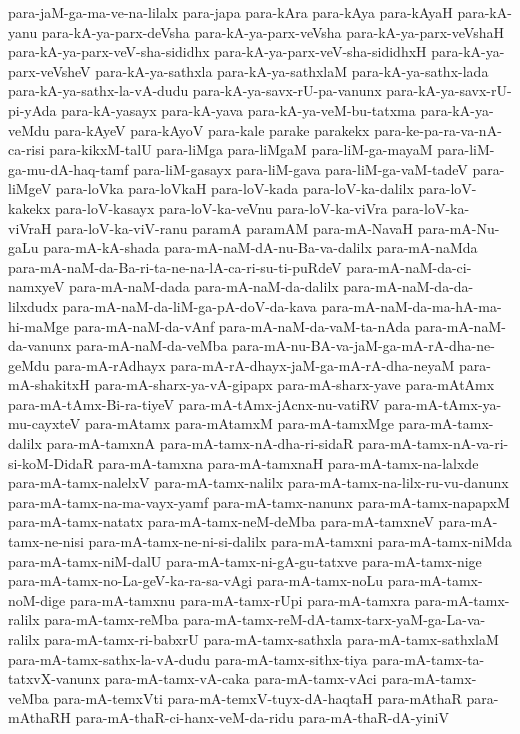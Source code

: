 {para-jaM-ga-ma-ve-na-lilalx
para-japa
para-kAra
para-kAya
para-kAyaH
para-kA-yanu
para-kA-ya-parx-deVsha
para-kA-ya-parx-veVsha
para-kA-ya-parx-veVshaH
para-kA-ya-parx-veV-sha-sididhx
para-kA-ya-parx-veV-sha-sididhxH
para-kA-ya-parx-veVsheV
para-kA-ya-sathxla
para-kA-ya-sathxlaM
para-kA-ya-sathx-lada
para-kA-ya-sathx-la-vA-dudu
para-kA-ya-savx-rU-pa-vanunx
para-kA-ya-savx-rU-pi-yAda
para-kA-yasayx
para-kA-yava
para-kA-ya-veM-bu-tatxma
para-kA-ya-veMdu
para-kAyeV
para-kAyoV
para-kale
parake
parakekx
para-ke-pa-ra-va-nA-ca-risi
para-kikxM-talU
para-liMga
para-liMgaM
para-liM-ga-mayaM
para-liM-ga-mu-dA-haq-tamf
para-liM-gasayx
para-liM-gava
para-liM-ga-vaM-tadeV
para-liMgeV
para-loVka
para-loVkaH
para-loV-kada
para-loV-ka-dalilx
para-loV-kakekx
para-loV-kasayx
para-loV-ka-veVnu
para-loV-ka-viVra
para-loV-ka-viVraH
para-loV-ka-viV-ranu
paramA
paramAM
para-mA-NavaH
para-mA-Nu-gaLu
para-mA-kA-shada
para-mA-naM-dA-nu-Ba-va-dalilx
para-mA-naMda
para-mA-naM-da-Ba-ri-ta-ne-na-lA-ca-ri-su-ti-puRdeV
para-mA-naM-da-ci-namxyeV
para-mA-naM-dada
para-mA-naM-da-dalilx
para-mA-naM-da-da-lilxdudx
para-mA-naM-da-liM-ga-pA-doV-da-kava
para-mA-naM-da-ma-hA-ma-hi-maMge
para-mA-naM-da-vAnf
para-mA-naM-da-vaM-ta-nAda
para-mA-naM-da-vanunx
para-mA-naM-da-veMba
para-mA-nu-BA-va-jaM-ga-mA-rA-dha-ne-geMdu
para-mA-rAdhayx
para-mA-rA-dhayx-jaM-ga-mA-rA-dha-neyaM
para-mA-shakitxH
para-mA-sharx-ya-vA-gipapx
para-mA-sharx-yave
para-mAtAmx
para-mA-tAmx-Bi-ra-tiyeV
para-mA-tAmx-jAcnx-nu-vatiRV
para-mA-tAmx-ya-mu-cayxteV
para-mAtamx
para-mAtamxM
para-mA-tamxMge
para-mA-tamx-dalilx
para-mA-tamxnA
para-mA-tamx-nA-dha-ri-sidaR
para-mA-tamx-nA-va-ri-si-koM-DidaR
para-mA-tamxna
para-mA-tamxnaH
para-mA-tamx-na-lalxde
para-mA-tamx-nalelxV
para-mA-tamx-nalilx
para-mA-tamx-na-lilx-ru-vu-danunx
para-mA-tamx-na-ma-vayx-yamf
para-mA-tamx-nanunx
para-mA-tamx-napapxM
para-mA-tamx-natatx
para-mA-tamx-neM-deMba
para-mA-tamxneV
para-mA-tamx-ne-nisi
para-mA-tamx-ne-ni-si-dalilx
para-mA-tamxni
para-mA-tamx-niMda
para-mA-tamx-niM-dalU
para-mA-tamx-ni-gA-gu-tatxve
para-mA-tamx-nige
para-mA-tamx-no-La-geV-ka-ra-sa-vAgi
para-mA-tamx-noLu
para-mA-tamx-noM-dige
para-mA-tamxnu
para-mA-tamx-rUpi
para-mA-tamxra
para-mA-tamx-ralilx
para-mA-tamx-reMba
para-mA-tamx-reM-dA-tamx-tarx-yaM-ga-La-va-ralilx
para-mA-tamx-ri-babxrU
para-mA-tamx-sathxla
para-mA-tamx-sathxlaM
para-mA-tamx-sathx-la-vA-dudu
para-mA-tamx-sithx-tiya
para-mA-tamx-ta-tatxvX-vanunx
para-mA-tamx-vA-caka
para-mA-tamx-vAci
para-mA-tamx-veMba
para-mA-temxVti
para-mA-temxV-tuyx-dA-haqtaH
para-mAthaR
para-mAthaRH
para-mA-thaR-ci-hanx-veM-da-ridu
para-mA-thaR-dA-yiniV
}
